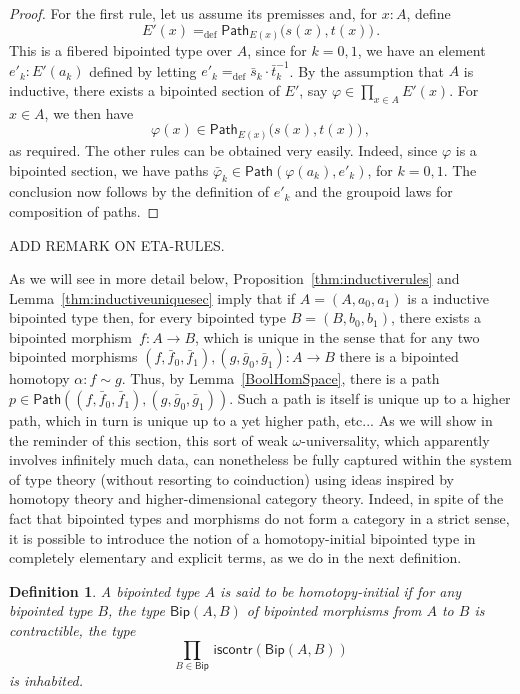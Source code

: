\documentclass[10pt,a4paper,oneside,reqno]{amsart}
\numberwithin{equation}{section}
\theoremstyle{mythm}
\theoremstyle{mydef}
\newtheorem{definition}[theorem]{Definition}
\theoremstyle{myrmk}
\newcommand{\ie}{\text{i.e.\ }}
\newcommand{\defeq}{=_{\mathrm{def}}}
\newcommand{\co}{\colon}
\newcommand{\iscontr}{\mathsf{iscontr}}
\newcommand{\Id}{\mathsf{Path}}
\newcommand{\Bip}{\mathsf{Bip}}
\newcommand{\BipHom}{\mathsf{Bip}}
\begin{document}
\begin{proof} For the first rule, let us assume its premisses and, for $x \co A$, define
\[
 E'(x) \defeq \Id_{E(x)} \big( s(x), t(x) \big) \, .
\]
This is a fibered bipointed type over $A$, since for $k = 0, 1$, we have an element $e'_k \co E'(a_k)$  defined by letting
$e'_k  \defeq \bar{s}_k \cdot \bar{t}_k^{-1}$.  By the assumption that $A$ is inductive, there exists a bipointed section of $E'$, say $\varphi  \in \prod_{x \in A} E'(x)$. 
For $x \in A$, we then have
\[
\varphi(x) \in \Id_{E(x)} \big(  s(x), t(x) \big)  \, ,
 \]
 as required. The other rules  can be obtained very easily. Indeed, since $\varphi$ is a bipointed section, we
 have paths $\bar{\varphi}_k \in \Id( \varphi(a_k), e'_k)$, for $k = 0, 1$. The conclusion now follows by the definition of $e'_k$ and the groupoid laws for
 composition of paths. 
 \end{proof} 
 
 \medskip
 
 ADD REMARK ON ETA-RULES.
 
 \medskip

As we will see in more detail below, Proposition~\ref{thm:inductiverules} and Lemma~\ref{thm:inductiveuniquesec}
imply that if $A = (A, a_0, a_1)$ is a inductive bipointed type then, for every bipointed type $B = (B, b_0, b_1)$, 
there exists a bipointed morphism~$f \co A \to B$, which is unique in the sense that  for any two bipointed morphisms $(f, \bar{f}_0, \bar{f}_1), (g, \bar{g}_0, \bar{g}_1) \co A \to B$  there is a bipointed homotopy $ \alpha \co f \sim g$. Thus, by Lemma~\ref{BoolHomSpace},
there is a path $p \in \Id((f, \bar{f}_0, \bar{f}_1), (g, \bar{g}_0, \bar{g}_1))$. Such a path is itself is unique up to a higher path, which in turn is unique up to a yet higher path, etc... As we will show in the reminder of this section, this sort of weak $\omega$-universality, which apparently involves infinitely much data, can nonetheless be fully captured within the system of type theory (without resorting to coinduction) using ideas inspired by homotopy theory and higher-dimensional category theory. Indeed, in spite of the fact that bipointed types and morphisms do not form a category in a strict sense, it is possible to introduce the  notion of a homotopy-initial bipointed type in completely elementary and explicit terms, as we do in the next definition.


\begin{definition}\label{def:BoolInit}
A bipointed type $A$ is said to be \emph{homotopy-initial}  if for any bipointed type $B$, the type $\BipHom(A,B)$ of bipointed morphisms from $A$ to $B$
is contractible, \ie the type
\[
\prod_{B \in \Bip} \, \iscontr(\BipHom(A, B) )
\] 
is inhabited.
\end{definition}
\end{document}
